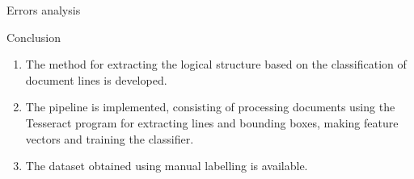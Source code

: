 \documentclass{beamer}
\begin{document}
\begin{frame}{Errors analysis}
\end{frame}

\begin{frame}{Conclusion}
    \begin{enumerate}
        \item The method for extracting the logical structure based on the classification of document lines is developed.
        \item The pipeline is implemented, consisting of processing documents using the Tesseract program for extracting lines and bounding boxes, making feature vectors and training the classifier.
        \item The dataset obtained using manual labelling is available.
    \end{enumerate}
\end{frame}
\end{document}
